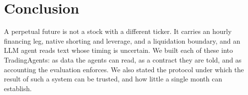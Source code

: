 \documentclass[11pt]{article}
\theoremstyle{remark}
\begin{document}
\section{Conclusion}
A perpetual future is not a stock with a different ticker. It carries an hourly financing leg, native shorting and leverage, and a liquidation boundary, and an LLM agent reads text whose timing is uncertain. We built each of these into TradingAgents: as data the agents can read, as a contract they are told, and as accounting the evaluation enforces. We also stated the protocol under which the result of such a system can be trusted, and how little a single month can establish.



\end{document}
